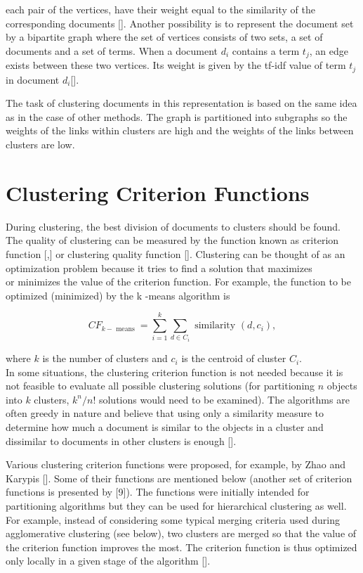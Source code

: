 each pair of the vertices, have their weight equal to the similarity of the corresponding documents [\cite{ref46}]. Another possibility is to represent the document set by a bipartite graph where the set of vertices consists of two sets, a set of documents and a set of terms. When a document $d_{i}$ contains a term $t_{j}$, an edge exists between these two vertices. Its weight is given by the tf-idf value of term $t_{j}$ in document $d_{i}$[\cite{ref291}].

The task of clustering documents in this representation is based on the same idea as in the case of other methods. The graph is partitioned into subgraphs so the weights of the links within clusters are high and the weights of the links between clusters are low.

\section{Clustering Criterion Functions}
During clustering, the best division of documents to clusters should be found. The quality of clustering can be measured by the function known as criterion function [\cite{ref292},\cite{ref9}] or clustering quality function [\cite{ref87}]. Clustering can be thought of as an optimization problem because it tries to find a solution that maximizes\\
or minimizes the value of the criterion function. For example, the function to be optimized (minimized) by the k -means algorithm is


\begin{equation*}
C F_{k-\text { means }}=\sum_{i=1}^{k} \sum_{d \in C_{i}} \text { similarity }\left(d, c_{i}\right), \tag{12.14}
\end{equation*}


where $k$ is the number of clusters and $c_{i}$ is the centroid of cluster $C_{i}$.\\
In some situations, the clustering criterion function is not needed because it is not feasible to evaluate all possible clustering solutions (for partitioning $n$ objects into $k$ clusters, $k^{n} / n!$ solutions would need to be examined). The algorithms are often greedy in nature and believe that using only a similarity measure to determine how much a document is similar to the objects in a cluster and dissimilar to documents in other clusters is enough [\cite{ref87}].

Various clustering criterion functions were proposed, for example, by Zhao and Karypis [\cite{ref291}]. Some of their functions are mentioned below (another set of criterion functions is presented by [9]). The functions were initially intended for partitioning algorithms but they can be used for hierarchical clustering as well. For example, instead of considering some typical merging criteria used during agglomerative clustering (see below), two clusters are merged so that the value of the criterion function improves the most. The criterion function is thus optimized only locally in a given stage of the algorithm [\cite{ref292}].


